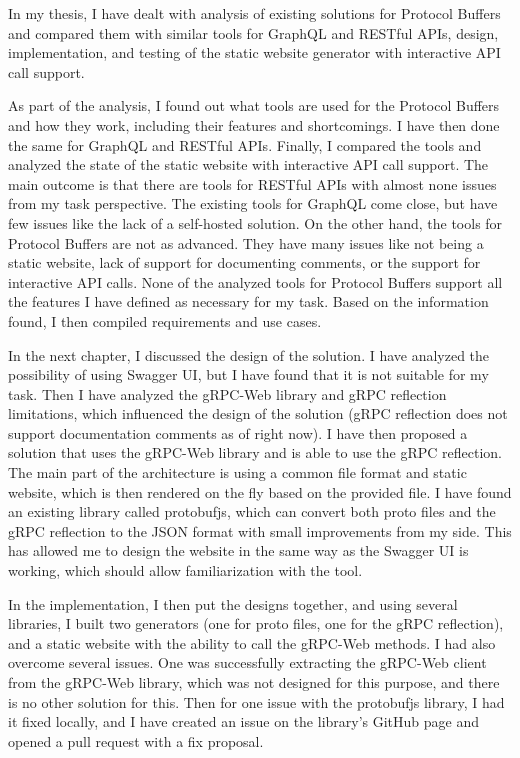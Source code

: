 In my thesis, I have dealt with analysis of existing solutions for Protocol Buffers and compared them with similar tools for GraphQL and RESTful APIs, design, implementation, and testing of the static website generator with interactive API call support.

As part of the analysis, I found out what tools are used for the Protocol Buffers and how they work, including their features and shortcomings.
I have then done the same for GraphQL and RESTful APIs.
Finally, I compared the tools and analyzed the state of the static website with interactive API call support.
The main outcome is that there are tools for RESTful APIs with almost none issues from my task perspective.
The existing tools for GraphQL come close, but have few issues like the lack of a self-hosted solution.
On the other hand, the tools for Protocol Buffers are not as advanced.
They have many issues like not being a static website, lack of support for documenting comments, or the support for interactive API calls.
None of the analyzed tools for Protocol Buffers support all the features I have defined as necessary for my task.
Based on the information found, I then compiled requirements and use cases.

In the next chapter, I discussed the design of the solution.
I have analyzed the possibility of using Swagger UI, but I have found that it is not suitable for my task.
Then I have analyzed the gRPC-Web library and gRPC reflection limitations, which influenced the design of the solution (gRPC reflection does not support documentation comments as of right now).
I have then proposed a solution that uses the gRPC-Web library and is able to use the gRPC reflection.
The main part of the architecture is using a common file format and static website, which is then rendered on the fly based on the provided file.
I have found an existing library called protobufjs, which can convert both proto files and the gRPC reflection to the JSON format with small improvements from my side.
This has allowed me to design the website in the same way as the Swagger UI is working, which should allow familiarization with the tool.

In the implementation, I then put the designs together, and using several libraries, I built two generators (one for proto files, one for the gRPC reflection), and a static website with the ability to call the gRPC-Web methods.
I had also overcome several issues.
One was successfully extracting the gRPC-Web client from the gRPC-Web library, which was not designed for this purpose, and there is no other solution for this.
Then for one issue with the protobufjs library, I had it fixed locally, and I have created an issue on the library's GitHub page and opened a pull request with a fix proposal.

